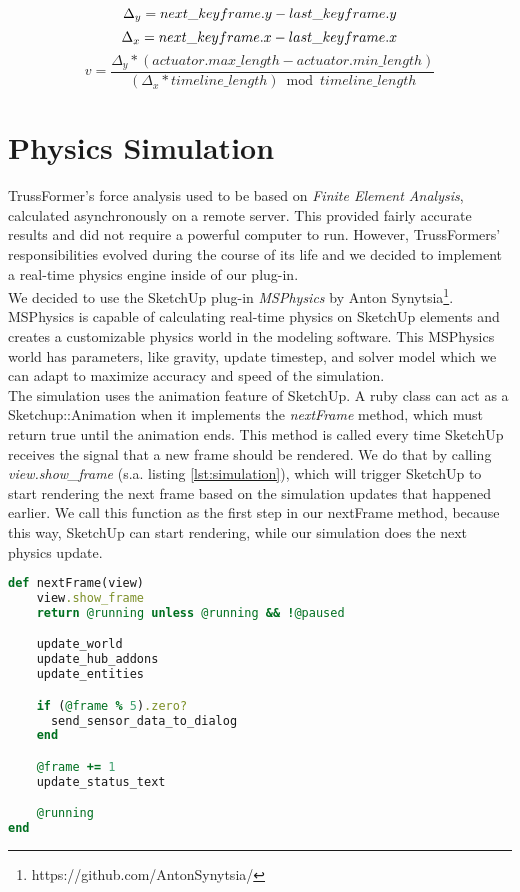 \begin{equation}
  \Delta_y = next\_keyframe.y - last\_keyframe.y\\
\end{equation}
\begin{equation}
  \Delta_x = next\_keyframe.x - last\_keyframe.x\\
\end{equation}
\begin{equation}
  v = \frac{\Delta_y * (actuator.max\_length - actuator.min\_length)}{(\Delta_x * timeline\_length) \bmod timeline\_length}
\end{equation}

\section{Physics Simulation}\label{sec:simulation}
TrussFormer's force analysis used to be based on \textit{Finite Element Analysis}, calculated asynchronously on a remote server. This provided fairly accurate results and did not require a powerful computer to run. However, TrussFormers' responsibilities evolved during the course of its life and we decided to implement a real-time physics engine inside of our plug-in.\\
We decided to use the SketchUp plug-in \textit{MSPhysics} by Anton Synytsia\footnote{https://github.com/AntonSynytsia/}. MSPhysics is capable of calculating real-time physics on SketchUp elements and creates a customizable physics world in the modeling software. This MSPhysics world has parameters, like gravity, update timestep, and solver model which we can adapt to maximize accuracy and speed of the simulation.\\
The simulation uses the animation feature of SketchUp. A ruby class can act as a Sketchup::Animation when it implements the \textit{nextFrame} method, which must return true until the animation ends. This method is called every time SketchUp receives the signal that a new frame should be rendered. We do that by calling \textit{view.show\_frame} (s.a. listing \ref{lst:simulation}), which will trigger SketchUp to start rendering the next frame based on the simulation updates that happened earlier. We call this function as the first step in our nextFrame method, because this way, SketchUp can start rendering, while our simulation does the next physics update.\\
\begin{lstlisting}[language=Ruby, label={lst:simulation}, caption=Simulation nextFrame method]
def nextFrame(view)
    view.show_frame
    return @running unless @running && !@paused

    update_world
    update_hub_addons
    update_entities

    if (@frame % 5).zero?
      send_sensor_data_to_dialog
    end

    @frame += 1
    update_status_text

    @running
end
\end{lstlisting}

